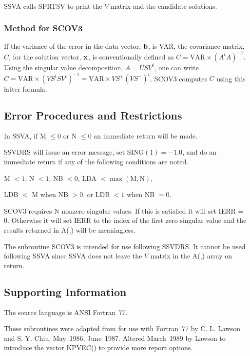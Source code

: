 \documentclass[twoside]{MATH77}
\begin{document}
SSVA calls SPRTSV to print the $V$ matrix and the candidate solutions.

\subsubsection{Method for SCOV3}

If the variance of the error in the data vector, ${\bf b}$, is VAR, the
covariance matrix, $C$, for the solution vector, ${\bf x}$, is conventionally
defined as $C = \text{VAR}\times (A^tA)^{-1}$. Using the singular value
decomposition, $A = USV^t$, one can write $C =\text{VAR}\times
(VS^tSV^t)^{-1} = \text{VAR}\times VS^+(VS^+)^t$. SCOV3 computes $C$ using
this latter formula.




\subsection{Error Procedures and Restrictions}

In SSVA, if M $\leq 0$ or N $\leq 0$ an immediate return will be made.

SSVDRS will issue an error message, set SING$(1) = -1.0$, and do an
immediate return if any of the following conditions are noted.

\hspace{.2in}M $< 1$, N $< 1$, NB $< 0$, LDA $< \max (\text{M},\text{N}),$

\hspace{.2in}LDB $<$ M when NB $> 0$, or LDB $< 1$ when NB $= 0.$

SCOV3 requires N nonzero singular values. If this is satisfied it will set
IERR = 0. Otherwise it will set IERR to the index of the first zero singular
value and the results returned in A(,) will be meaningless.

The subroutine SCOV3 is intended for use following SSVDRS. It cannot be used
following SSVA since SSVA does not leave the $V$ matrix in the A(,) array on
return.

\subsection{Supporting Information}

The source language is ANSI Fortran~77.

These subroutines were adapted from \cite{Lawson:1974:SLS} for use with
Fortran~77 by C.  L.  Lawson and S.  Y.  Chiu, May~1986, June~1987.
Altered March~1989 by Lawson to introduce the vector KPVEC() to provide
more report options.
\end{document}

